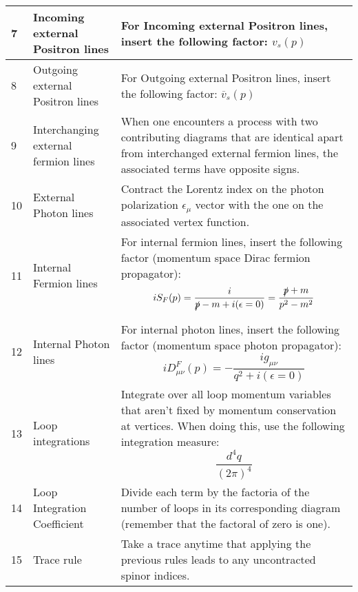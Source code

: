 \documentclass[a4]{article}
\begin{document}
\begin{longtable}{| p{} | p{} | p{} |}
            \hline
            7 & Incoming external Positron lines & For Incoming external Positron lines, insert the following factor: $v_{s} (p)$ \\
            \hline
            8 & Outgoing external Positron lines & For Outgoing external Positron lines, insert the following factor: $\overline{v}_{s} (p)$ \\
            \hline
            9 & Interchanging external fermion lines & 
            When one encounters a process with two contributing diagrams that are identical apart from interchanged external
            fermion lines, the associated terms have opposite signs. \\
            \hline
            10 & External Photon lines & 
            Contract the Lorentz index on the photon polarization $\epsilon_{\mu}$ vector with the one
            on the associated vertex function. \\
            \hline
            11 & Internal Fermion lines & 
            For internal fermion lines, insert the following factor (momentum space Dirac fermion propagator):
            \begin{equation}
                i S_{F} (p) = \frac{i}{\slashed{p} - m + i (\epsilon = 0)} = \frac{\slashed{p} + m}{p^2 - m^2}
            \end{equation} \\
            \hline
            12 & Internal Photon lines & 
            For internal photon lines, insert the following factor (momentum space photon propagator):
            \begin{equation}
                i D^{F}_{\mu \nu} (p) = - \frac{i g_{\mu \nu}}{q^2 + i(\epsilon = 0)}
            \end{equation} \\
            \hline
            13 & Loop integrations & 
            Integrate over all loop momentum variables that aren't fixed by momentum conservation at vertices. When doing this, use
            the following integration measure:
            \begin{equation}
                \frac{d^4 q}{(2 \pi)^4}
            \end{equation} \\
            \hline
            14 & Loop Integration Coefficient & 
            Divide each term by the factoria of the number of loops in its corresponding diagram (remember that the factoral of zero
            is one). \\
            \hline
            15 & Trace rule & Take a trace anytime that applying the previous rules leads to any uncontracted spinor indices. \\
            \hline
        \end{longtable}
    \endgroup
\end{document}
